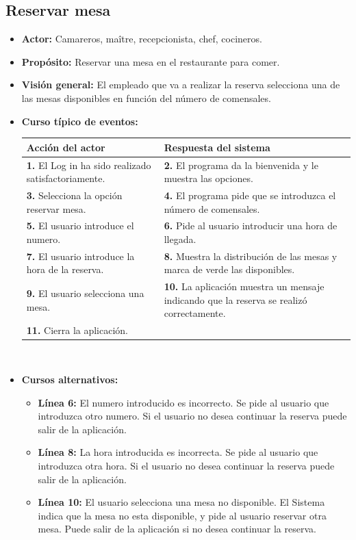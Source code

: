 \documentclass[spanish,a4paper,12pt]{report}	%
\begin{document}
		\subsection{Reservar mesa} 
			\begin{itemize}
			\item \textbf{Actor:} Camareros, maître, recepcionista, chef, cocineros.
			\item \textbf{Propósito: } Reservar una mesa en el restaurante para comer.
			\item \textbf{Visión general:} El empleado que va a realizar la reserva selecciona una de las mesas disponibles en función del número de comensales.
			\item \textbf{Curso típico de eventos:} 	\\
				\begin{tabular}{|p{6cm}||p{6cm}|}
				\hline
				\textbf{Acción del actor} & \textbf{Respuesta del sistema} \\ \hline \hline
				\textbf{1.}  El Log in ha sido realizado satisfactoriamente. & \textbf{2.} El programa da la bienvenida y le muestra las opciones. \\ \hline
				\textbf{3.} Selecciona la opción reservar mesa. & \textbf{4.} El programa pide que se introduzca el número de comensales. \\ \hline
				\textbf{5.} El usuario introduce el numero.	& \textbf{6.} Pide al usuario introducir una hora de llegada. \\ \hline
				\textbf{7.} El usuario introduce la hora de la reserva.	& \textbf{8.} Muestra la distribución de las mesas y marca de verde las disponibles. \\ \hline
				\textbf{9.} El usuario selecciona una mesa. & \textbf{10.} La aplicación muestra un mensaje indicando que la reserva se realizó correctamente. \\ \hline
				\textbf{11.} Cierra la aplicación. & \textbf{} \\ \hline
			\end{tabular}
			\\
			\item \textbf{Cursos alternativos:} 
			\begin{itemize}
			\item  \textbf{Línea 6:} El numero introducido es incorrecto. Se pide al usuario que introduzca otro numero. Si el usuario no desea continuar la reserva puede salir de la aplicación.
			\item  \textbf{Línea 8:} La hora introducida es incorrecta. Se pide al usuario que introduzca otra hora. Si el usuario no desea continuar la reserva puede salir de la aplicación.
			\item  \textbf{Línea 10:} El usuario selecciona una mesa no disponible. El Sistema indica que la mesa no esta disponible, y pide al usuario reservar otra mesa. Puede salir de la aplicación si no desea continuar la reserva.
			\end {itemize}
		\end {itemize}
		
\end{document}
